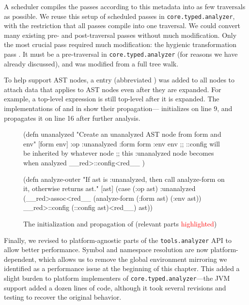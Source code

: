 A scheduler compiles the passes according to this metadata into as few traversals as possible.
We reuse this setup of scheduled passes in \texttt{core.typed.analyzer},
with the restriction that all passes compile into one traversal.
We could convert many existing pre- and post-traversal passes without much modification.
Only the most crucial pass required much modification:
the hygienic transformation pass .
It must be a pre-traversal in \texttt{core.typed.analyzer} (for reasons we have already discussed),
and was modified from a full tree walk.


To help support  AST nodes, a 
entry (abbreviated ) was added to all nodes
to attach data that applies to AST nodes even after they are expanded.
For example, a top-level expression is still top-level after it is expanded.
The implementations of  and 
in  show their propagation---
initializes  on line 9, and  propagates it on line 16 after further analysis.

\begin{figure}
  \lstset{numbers=left}
  \begin{cljlisting}
(defn unanalyzed
  "Create an unanalyzed AST node from form and env"
  [form env]
  {:op :unanalyzed
   :form form
   :env env
   ;; ::config will be inherited by whatever node
   ;; this :unanalyzed node becomes when analyzed
   __red>::config<red__ {}})

(defn analyze-outer
  "If ast is :unanalyzed, then call analyze-form on it, otherwise returns ast."
  [ast]
  (case (:op ast)
    :unanalyzed (__red>assoc<red__ (analyze-form (:form ast) (:env ast))
                       __red>::config (::config ast)<red__)
    ast))
\end{cljlisting}
  \caption{The initialization and propagation of  (relevant parts \textcolor{red}{highlighted})}
  \label{fig:analyzer:config-inheritance}
\end{figure}

Finally, we revised to platform-agnostic parts of the \texttt{tools.analyzer} API
to allow better performance.
Symbol and namespace resolution are now platform-dependent, which allows us to 
remove the global environment mirroring we identified as a performance issue
at the beginning of this chapter.
This added a slight burden to platform implementers of 
\texttt{core.typed.analyzer}---the JVM support added a dozen lines of code, although
it took several revisions and testing to recover the original behavior.

